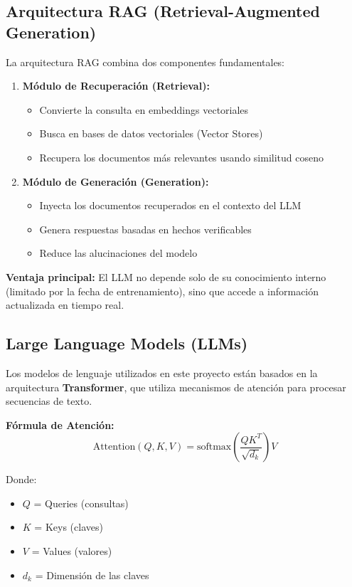 \documentclass[12pt,a4paper]{article}
\begin{document}
\subsection{Arquitectura RAG (Retrieval-Augmented Generation)}

La arquitectura RAG combina dos componentes fundamentales:

\begin{enumerate}
    \item \textbf{Módulo de Recuperación (Retrieval):}
    \begin{itemize}
        \item Convierte la consulta en embeddings vectoriales
        \item Busca en bases de datos vectoriales (Vector Stores)
        \item Recupera los documentos más relevantes usando similitud coseno
    \end{itemize}

    \item \textbf{Módulo de Generación (Generation):}
    \begin{itemize}
        \item Inyecta los documentos recuperados en el contexto del LLM
        \item Genera respuestas basadas en hechos verificables
        \item Reduce las alucinaciones del modelo
    \end{itemize}
\end{enumerate}

\textbf{Ventaja principal:} El LLM no depende solo de su conocimiento interno (limitado por la fecha de entrenamiento), sino que accede a información actualizada en tiempo real.

\subsection{Large Language Models (LLMs)}

Los modelos de lenguaje utilizados en este proyecto están basados en la arquitectura \textbf{Transformer}, que utiliza mecanismos de atención para procesar secuencias de texto.

\textbf{Fórmula de Atención:}
\[
\text{Attention}(Q, K, V) = \text{softmax}\left(\frac{QK^T}{\sqrt{d_k}}\right)V
\]

Donde:
\begin{itemize}
    \item $Q$ = Queries (consultas)
    \item $K$ = Keys (claves)
    \item $V$ = Values (valores)
    \item $d_k$ = Dimensión de las claves
\end{itemize}
\end{document}
